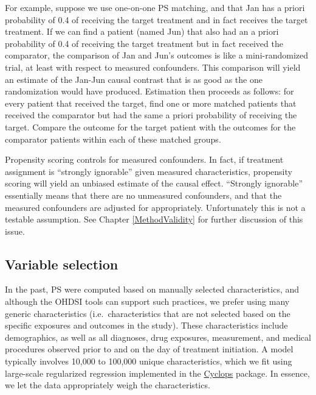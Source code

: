 \documentclass[11pt]{book}
\theoremstyle{definition}
\theoremstyle{definition}
\theoremstyle{definition}
\theoremstyle{remark}
\begin{document}
For example, suppose we use one-on-one PS matching, and that Jan has a priori probability of 0.4 of receiving the target treatment and in fact receives the target treatment. If we can find a patient (named Jun) that also had an a priori probability of 0.4 of receiving the target treatment but in fact received the comparator, the comparison of Jan and Jun's outcomes is like a mini-randomized trial, at least with respect to measured confounders. This comparison will yield an estimate of the Jan-Jun causal contrast that is as good as the one randomization would have produced. Estimation then proceeds as follows: for every patient that received the target, find one or more matched patients that received the comparator but had the same a priori probability of receiving the target. Compare the outcome for the target patient with the outcomes for the comparator patients within each of these matched groups.

Propensity scoring controls for measured confounders. In fact, if treatment assignment is ``strongly ignorable'' given measured characteristics, propensity scoring will yield an unbiased estimate of the causal effect. ``Strongly ignorable'' essentially means that there are no unmeasured confounders, and that the measured confounders are adjusted for appropriately. Unfortunately this is not a testable assumption. See Chapter \ref{MethodValidity} for further discussion of this issue. 

\hypertarget{VariableSelection}{%
\subsection{Variable selection}\label{VariableSelection}}

In the past, PS were computed based on manually selected characteristics, and although the OHDSI tools can support such practices, we prefer using many generic characteristics (i.e.~characteristics that are not selected based on the specific exposures and outcomes in the study). \citep{tian_2018} These characteristics include demographics, as well as all diagnoses, drug exposures, measurement, and medical procedures observed prior to and on the day of treatment initiation. A model typically involves 10,000 to 100,000 unique characteristics, which we fit using large-scale regularized regression \citep{suchard_2013} implemented in the \href{https://ohdsi.github.io/Cyclops/}{Cyclops} package. In essence, we let the data appropriately weigh the characteristics.
\end{document}
